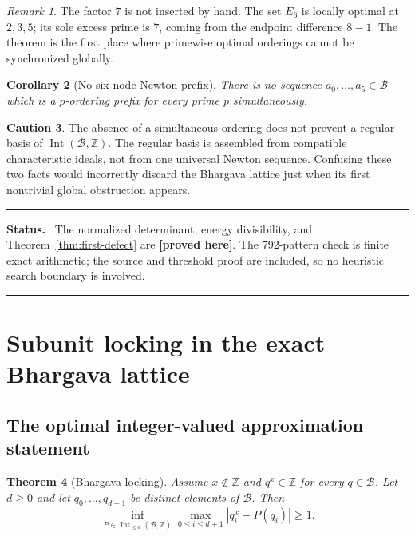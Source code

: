 \documentclass[11pt,oneside]{article}
\newtheorem{theorem}{Theorem}[section]
\newtheorem{corollary}[theorem]{Corollary}
\theoremstyle{definition}
\newtheorem{warning}[theorem]{Caution}
\theoremstyle{remark}
\newtheorem{remark}[theorem]{Remark}
\newcommand{\Z}{\mathbb Z}
\newcommand{\B}{\mathcal B}
\newcommand{\Int}{\operatorname{Int}}
\newcommand{\statusproved}{\textcolor{newgreen}{\textbf{[proved here]}}}
\newenvironment{statusbox}
{\begin{center}\begin{minipage}{0.94\textwidth}\raggedright\hrule
\vspace{0.42em}\textbf{Status.}\ }
{\par\vspace{0.32em}\hrule\end{minipage}\end{center}}
\begin{document}
\begin{remark}
The factor \(7\) is not inserted by hand.  The set \(E_6\) is locally optimal at \(2,3,5\);
its sole excess prime is \(7\), coming from the endpoint difference \(8-1\).  The theorem is
the first place where primewise optimal orderings cannot be synchronized globally.
\end{remark}

\begin{corollary}[No six-node Newton prefix]
\label{cor:no-six-newton}
There is no sequence \(a_0,\ldots,a_5\in\B\) which is a \(p\)-ordering prefix for every prime
\(p\) simultaneously.
\end{corollary}

\begin{warning}
The absence of a simultaneous ordering does not prevent a regular basis of
\(\Int(\B,\Z)\).  The regular basis is assembled from compatible characteristic ideals, not
from one universal Newton sequence.  Confusing these two facts would incorrectly discard the
Bhargava lattice just when its first nontrivial global obstruction appears.
\end{warning}

\begin{statusbox}
The normalized determinant, energy divisibility, and Theorem~\ref{thm:first-defect} are
\statusproved.  The 792-pattern check is finite exact arithmetic; the source and threshold
proof are included, so no heuristic search boundary is involved.
\end{statusbox}

\section{Subunit locking in the exact Bhargava lattice}
\label{sec:locking}

\subsection{The optimal integer-valued approximation statement}

\begin{theorem}[Bhargava locking]
\label{thm:bhargava-locking}
Assume \(x\notin\Z\) and \(q^x\in\Z\) for every \(q\in\B\).  Let \(d\ge0\) and let
\(q_0,\ldots,q_{d+1}\) be distinct elements of \(\B\).  Then
\begin{equation}
 \inf_{P\in\Int_{\le d}(\B,\Z)}
 \max_{0\le i\le d+1}|q_i^x-P(q_i)|
 \ge1.
 \label{eq:locking-distance}
\end{equation}
\end{theorem}
\end{document}
